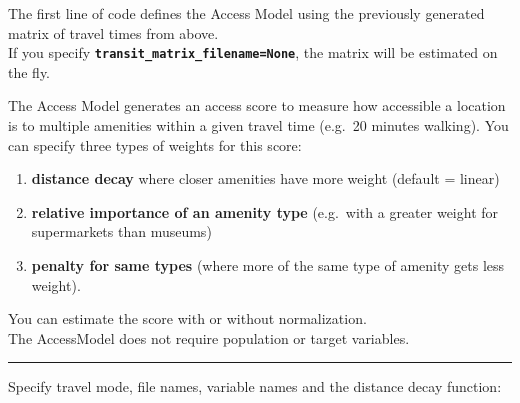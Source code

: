 \documentclass[11pt]{article}
\providecommand{\tightlist}{%
      \setlength{\itemsep}{0pt}\setlength{\parskip}{0pt}}
\begin{document}
    The first line of code defines the Access Model using the previously
generated matrix of travel times from above.\\
If you specify \textbf{\texttt{transit\_matrix\_filename=None}}, the
matrix will be estimated on the fly.

The Access Model generates an access score to measure how accessible a
location is to multiple amenities within a given travel time (e.g.~20
minutes walking). You can specify three types of weights for this score:

\begin{enumerate}
\def\labelenumi{\arabic{enumi})}
\tightlist
\item
  \textbf{distance decay} where closer amenities have more weight
  (default = linear)\\
\item
  \textbf{relative importance of an amenity type} (e.g.~with a greater
  weight for supermarkets than museums)\\
\item
  \textbf{penalty for same types} (where more of the same type of
  amenity gets less weight).
\end{enumerate}

You can estimate the score with or without normalization.\\
The AccessModel does not require population or target variables.

    \begin{center}\rule{0.5\linewidth}{\linethickness}\end{center}

Specify travel mode, file names, variable names and the distance decay
function:
\end{document}
